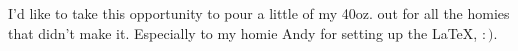 \begin{acknowledgements} 
I'd like to take this opportunity to pour a little of my 40oz. out for all
the homies that didn't make it.
Especially to my homie Andy for setting up the \LaTeX, $:)$.
\end{acknowledgements}
